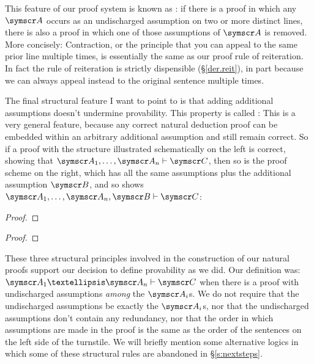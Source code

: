 This feature of our proof system is known as : if there is a proof in which any $\meta{A}$ occurs as an undischarged assumption on two or more distinct lines, there is also a proof in which one of those assumptions of $\meta{A}$ is removed. More concisely:  
Contraction, or the principle that you can appeal to the same prior line multiple times, is essentially the same as our proof rule of reiteration. In fact the rule of reiteration is strictly dispensible (§\ref{der.reit}), in part because we can always appeal instead to the original sentence multiple times.

The final structural feature I want to point to is that adding additional assumptions doesn't undermine provability. This property is called :  This is a very general feature, because any correct natural deduction proof can be embedded within an arbitrary additional assumption and still remain correct. So if a proof with the structure illustrated schematically on the left is correct, showing that $\meta{A}_{1},\ldots,\meta{A}_{n} \proves \meta{C}$, then so is the proof scheme on the right, which has all the same assumptions plus the additional assumption $\meta{B}$, and so shows $\meta{A}_{1},\ldots,\meta{A}_{n},\meta{B} \proves \meta{C}$: \begin{multicols}{2}\noindent\begin{proof}
	\have[\ ]{}{\vdots}
	\open
	\have[\ ]{}{\vdots}
\end{proof}\qquad\begin{proof}
	\open
	\have[\ ]{}{\vdots}
	\open
	\have[\ ]{}{\vdots}
\end{proof}\end{multicols}

These three structural principles involved in the construction of our natural proofs support our decision to define provability as we did. Our definition was:  $\meta{A}_{1}…\meta{A}_{n}\proves \meta{C}$ when there is a proof with undischarged assumptions \emph{among} the $\meta{A}_{i}$s. We do not require that the undischarged assumptions be exactly the $\meta{A}_{i}$s, nor that the undischarged assumptions don't contain any redundancy, nor that the order in which assumptions are made in the proof is the same as the order of the sentences on the left side of the turnstile. We will briefly mention some alternative logics in which some of these structural rules are abandoned in §\ref{s:nextsteps}.



